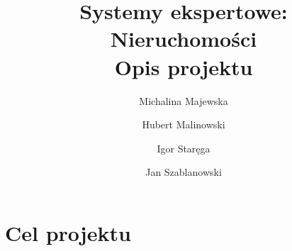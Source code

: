 \documentclass{article}
\title{Systemy ekspertowe: Nieruchomości \\ \large{Opis projektu}}
\author{Michalina Majewska
	\and Hubert Malinowski
	\and Igor Staręga
	\and Jan Szablanowski}
\begin{document}
\maketitle

\section{Cel projektu}




\end{document}
